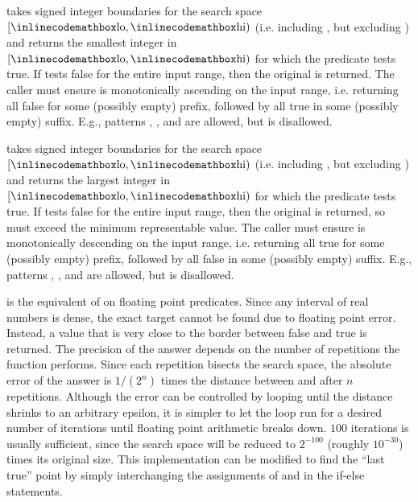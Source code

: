 \begin{compactitem}
  \item {} takes signed integer boundaries for the search space $[{\inlinecodemath{lo}}, {\inlinecodemath{hi}})$ (i.e. including , but excluding ) and returns the smallest integer  in $[{\inlinecodemath{lo}}, {\inlinecodemath{hi}})$ for which the predicate  tests true. If  tests false for the entire input range, then the original  is returned. The caller must ensure  is monotonically ascending on the input range, i.e. returning all false for some (possibly empty) prefix, followed by all true in some (possibly empty) suffix. E.g., patterns , , and  are allowed, but  is disallowed.
  \item {} takes signed integer boundaries for the search space $[{\inlinecodemath{lo}}, {\inlinecodemath{hi}})$ (i.e. including , but excluding ) and returns the largest integer  in $[{\inlinecodemath{lo}}, {\inlinecodemath{hi}})$ for which the predicate  tests true. If  tests false for the entire input range, then the original  is returned, so  must exceed the minimum representable value. The caller must ensure  is monotonically descending on the input range, i.e. returning all true for some (possibly empty) prefix, followed by all false in some (possibly empty) suffix. E.g., patterns , , and  are allowed, but  is disallowed.
  \item {} is the equivalent of  on floating point predicates. Since any interval of real numbers is dense, the exact target cannot be found due to floating point error. Instead, a value that is very close to the border between false and true is returned. The precision of the answer depends on the number of repetitions the function performs. Since each repetition bisects the search space, the absolute error of the answer is $1/(2^n)$ times the distance between  and  after $n$ repetitions. Although the error can be controlled by looping until the distance shrinks to an arbitrary epsilon, it is simpler to let the loop run for a desired number of iterations until floating point arithmetic breaks down. $100$ iterations is usually sufficient, since the search space will be reduced to $2^{-100}$ (roughly $10^{-30}$) times its original size. This implementation can be modified to find the ``last true'' point by simply interchanging the assignments of  and  in the if-else statements.
\end{compactitem}


